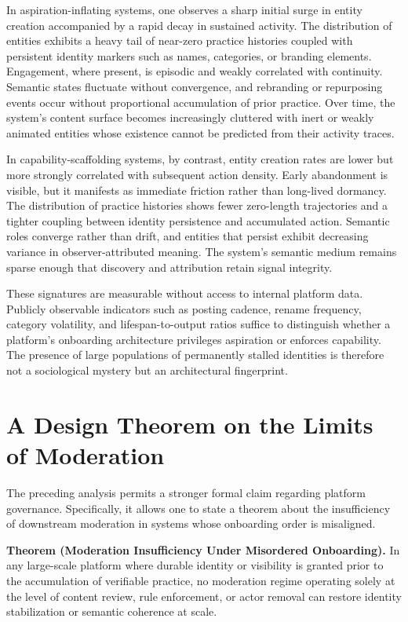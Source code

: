 \documentclass[11pt,oneside]{article}
\begin{document}
In aspiration-inflating systems, one observes a sharp initial surge in entity creation accompanied by a rapid decay in sustained activity. The distribution of entities exhibits a heavy tail of near-zero practice histories coupled with persistent identity markers such as names, categories, or branding elements. Engagement, where present, is episodic and weakly correlated with continuity. Semantic states fluctuate without convergence, and rebranding or repurposing events occur without proportional accumulation of prior practice. Over time, the system’s content surface becomes increasingly cluttered with inert or weakly animated entities whose existence cannot be predicted from their activity traces.

In capability-scaffolding systems, by contrast, entity creation rates are lower but more strongly correlated with subsequent action density. Early abandonment is visible, but it manifests as immediate friction rather than long-lived dormancy. The distribution of practice histories shows fewer zero-length trajectories and a tighter coupling between identity persistence and accumulated action. Semantic roles converge rather than drift, and entities that persist exhibit decreasing variance in observer-attributed meaning. The system’s semantic medium remains sparse enough that discovery and attribution retain signal integrity.

These signatures are measurable without access to internal platform data. Publicly observable indicators such as posting cadence, rename frequency, category volatility, and lifespan-to-output ratios suffice to distinguish whether a platform’s onboarding architecture privileges aspiration or enforces capability. The presence of large populations of permanently stalled identities is therefore not a sociological mystery but an architectural fingerprint.

\section{A Design Theorem on the Limits of Moderation}

The preceding analysis permits a stronger formal claim regarding platform governance. Specifically, it allows one to state a theorem about the insufficiency of downstream moderation in systems whose onboarding order is misaligned.

\textbf{Theorem (Moderation Insufficiency Under Misordered Onboarding).} In any large-scale platform where durable identity or visibility is granted prior to the accumulation of verifiable practice, no moderation regime operating solely at the level of content review, rule enforcement, or actor removal can restore identity stabilization or semantic coherence at scale.
\end{document}
